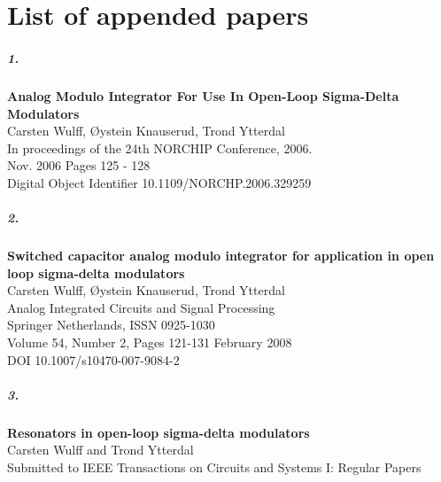 

\chapter*{List of appended papers}

\paragraph{1.}\textbf{Analog Modulo Integrator For Use In Open-Loop Sigma-Delta
  Modulators}\\
\indent Carsten Wulff, {\O}ystein Knauserud, Trond Ytterdal\\
\indent In proceedings of the 24th NORCHIP Conference, 2006.\\
\indent Nov. 2006 Pages 125 - 128\\
\indent Digital Object Identifier 10.1109/NORCHP.2006.329259 \\

\paragraph{2.}\textbf{Switched capacitor analog modulo integrator for application
  in open loop sigma-delta modulators}\\
\indent Carsten Wulff, {\O}ystein Knauserud, Trond Ytterdal\\
\indent Analog Integrated Circuits and Signal Processing\\
\indent Springer Netherlands, ISSN 0925-1030\\
\indent Volume 54, Number 2, Pages 121-131 February 2008\\
\indent DOI 10.1007/s10470-007-9084-2\\

\paragraph{3.}\textbf{Resonators in open-loop sigma-delta modulators}\\
\indent Carsten Wulff and Trond Ytterdal\\
\indent Submitted to IEEE Transactions on Circuits and Systems I: Regular Papers\\

